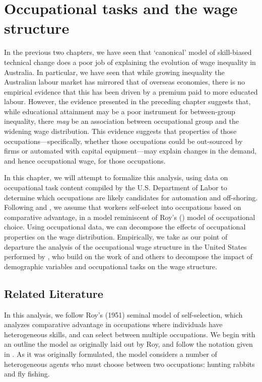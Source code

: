 \message{ !name(paper.tex)}\documentclass[a4paper,11pt]{report}
\numberwithin{equation}{chapter}
\begin{document}
\chapter{Occupational tasks and the wage structure}

In the previous two chapters, we have seen that `canonical' model of skill-biased technical change does a poor job of explaining the evolution of wage inequality in Australia. In particular, we have seen that while growing inequality the Australian labour market has mirrored that of overseas economies, there is no empirical evidence that this has been driven by a premium paid to more educated labour. However, the evidence presented in the preceding chapter suggests that, while educational attainment may be a poor instrument for between-group inequality, there {\em may} be an association between occupational group and the widening wage distribution. This evidence suggests that properties of those occupations---specifically, whether those occupations could be out-sourced by firms or automated with capital equipment---may explain changes in the demand, and hence occupational wage, for those occupations.

In this chapter, we will attempt to formalize this analysis, using data on occupational task content compiled by the U.S. Department of Labor to determine which occupations are likely candidates for automation and off-shoring. Following \citet{Autor2012} and \citet{Fortin2011}, we assume that workers self-select into occupations based on comparative advantage, in a model reminiscent of Roy's (\citeyear{Roy1951}) model of occupational choice. Using occupational data, we can decompose the effects of occupational properties on the wage distribution. Empirically, we take as our point of departure the analysis of the occupational wage structure in the United States performed by \citet{Fortin2011}, who build on the work of \citet{Oaxaca1973} and others to decompose the impact of demographic variables and occupational tasks on the wage structure.

\section{Related Literature}

In this analysis, we follow Roy's (1951) seminal model of self-selection, which analyzes comparative advantage in occupations where individuals have heterogeneous skills, and can select between multiple occupations. We begin with an outline the model as originally laid out by Roy, and follow the notation given in \citet{Heckman2008}. As it was originally formulated, the model considers a number of heterogeneous agents who must choose between two occupations: hunting rabbits and fly fishing. 
\end{document}
